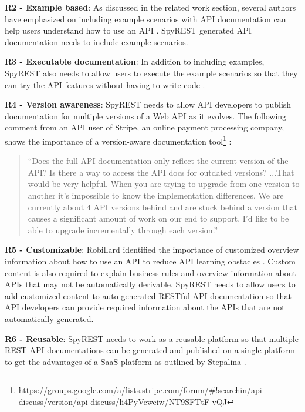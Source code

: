 \documentclass[conference]{IEEEtran}
\begin{document}
  \textbf{R2 - Example based}: As discussed in the related work section, several authors have emphasized on including example scenarios with API documentation can help users understand how to use an API \cite{Robillard_what_makes} \cite{Kuhn_on_designing} \cite{Hoffman_api_documentation} \cite{Nasehi_what_makes}. SpyREST generated API documentation needs to include example scenarios.

  \textbf{R3 - Executable documentation}: In addition to including examples, SpyREST also needs to allow users to execute the example scenarios so that they can try the API features without having to write code \cite{Hoffman_api_documentation} \cite{Myers_study}.

  \textbf{R4 - Version awareness}: SpyREST needs to allow API developers to publish documentation for multiple versions of a Web API as it evolves. The following comment from an API user of Stripe, an online payment processing company, shows the importance of a version-aware documentation tool\footnote{\url{https://groups.google.com/a/lists.stripe.com/forum/#!searchin/api-discuss/version/api-discuss/li4PyVcweiw/NT9SFTtF-vQJ}}
:
  \small
  \begin{quotation}
   ``Does the full API documentation only reflect the current version of the
    API?  Is there a way to access the API docs for outdated versions? ...That would be very helpful. When you are trying to upgrade from one version to another it's impossible to know the implementation differences. We are currently about 4 API versions behind and are stuck behind a version that causes a significant amount of work on our end to support. I'd like to be able to upgrade incrementally through each version.''
  \end{quotation}
  \normalsize

  \textbf{R5 - Customizable}: Robillard identified the importance of customized overview information about how to use an API to reduce API learning obstacles \cite{Robillard_what_makes}. Custom content is also required to explain business rules and overview information about APIs that may not be automatically derivable. SpyREST needs to allow users to add customized content to auto generated RESTful API documentation so that API developers can provide required information about the APIs that are not automatically generated.

  \textbf{R6 - Reusable}: SpyREST needs to work as a reusable platform so that multiple REST API documentations can be generated and published on a single platform to get the advantages of a SaaS platform as outlined by Stepalina \cite{Stepalina_saas}.
\end{document}
